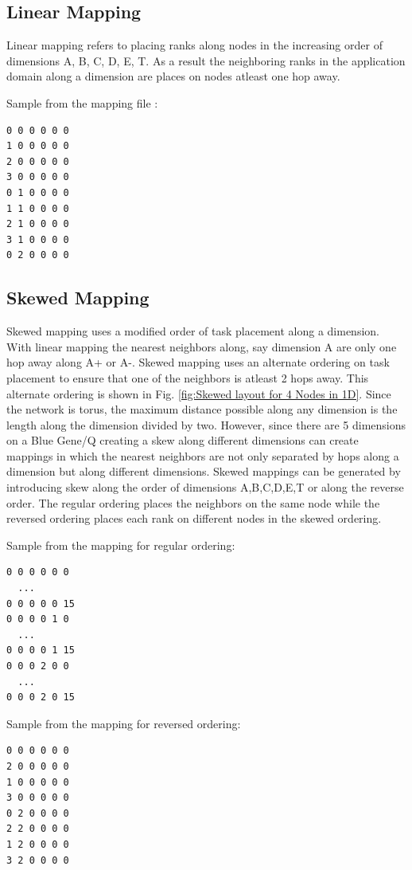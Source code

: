 \documentclass{acm_proc_article-sp}
\begin{document}
\subsection{Linear Mapping}
Linear mapping refers to placing ranks along nodes in the increasing order of dimensions A, B, C, D, E, T.
As a result the neighboring ranks in the application domain along a dimension are places on nodes atleast
one hop away.

Sample from the mapping file :
\begin{lstlisting}[frame=lines, basicstyle=\ttfamily,columns=fixed]
0 0 0 0 0 0
1 0 0 0 0 0
2 0 0 0 0 0
3 0 0 0 0 0
0 1 0 0 0 0
1 1 0 0 0 0
2 1 0 0 0 0
3 1 0 0 0 0
0 2 0 0 0 0
\end{lstlisting}

\subsection{Skewed Mapping}

Skewed mapping uses a modified order of task placement along a dimension.
With linear mapping the nearest neighbors along, say dimension A are only one hop away along A+ or A-.
Skewed mapping uses an alternate ordering on task placement to ensure that one of the neighbors is atleast
2 hops away. This alternate ordering is shown in Fig. \ref{fig:Skewed layout for 4 Nodes in 1D}.
Since the network is torus, the maximum distance possible along any dimension is the length along
the dimension divided by two. However, since there are 5 dimensions on a Blue Gene/Q creating a skew along different
dimensions can create mappings in which the nearest neighbors are not only separated by hops along a dimension but
along different dimensions. Skewed mappings can be generated by introducing skew along the order of dimensions
A,B,C,D,E,T or along the reverse order. The regular ordering places the neighbors on the same node while the reversed
ordering places each rank on different nodes in the skewed ordering.

Sample from the mapping for regular ordering:
\begin{lstlisting}[frame=lines, basicstyle=\ttfamily,columns=fixed]
0 0 0 0 0 0
  ...
0 0 0 0 0 15
0 0 0 0 1 0
  ...
0 0 0 0 1 15
0 0 0 2 0 0
  ...
0 0 0 2 0 15
\end{lstlisting}

Sample from the mapping for reversed ordering:
\begin{lstlisting}[frame=lines, basicstyle=\ttfamily,columns=fixed]
0 0 0 0 0 0
2 0 0 0 0 0
1 0 0 0 0 0
3 0 0 0 0 0
0 2 0 0 0 0
2 2 0 0 0 0
1 2 0 0 0 0
3 2 0 0 0 0
\end{lstlisting}
\end{document}
